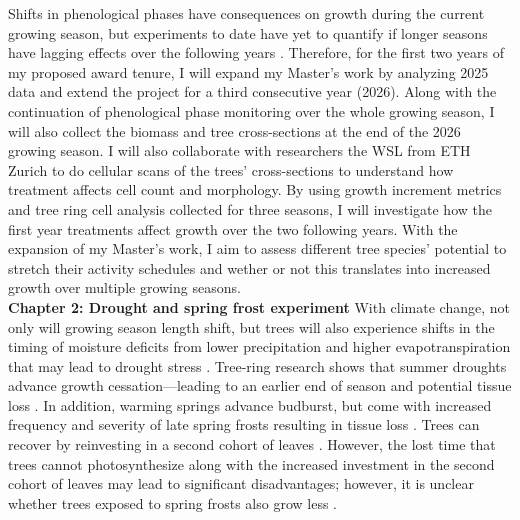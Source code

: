 \documentclass[12pt]{article}
\begin{document}
Shifts in phenological phases have consequences on growth during the current growing season, but experiments to date have yet to quantify if longer seasons have lagging effects over the following years \cite{chapin_ecology_1990,landhausser_partitioning_2012,lawrence_variable_2018,martens_first-year_2007,schott_premature_2013}. Therefore, for the first two years of my proposed award tenure, I will expand my Master's work by analyzing 2025 data and extend the project for a third consecutive year (2026). Along with the continuation of phenological phase monitoring over the whole growing season, I will also collect the biomass and tree cross-sections at the end of the 2026 growing season. I will also collaborate with researchers the WSL from ETH Zurich to do cellular scans of the trees' cross-sections to understand how treatment affects cell count and morphology. By using growth increment metrics and tree ring cell analysis collected for three seasons, I will investigate how the first year treatments affect growth over the two following years. With the expansion of my Master's work, I aim to assess different tree species’ potential to stretch their activity schedules and wether or not this translates into increased growth over multiple growing seasons. \\
\textbf{Chapter 2: Drought and spring frost experiment}
With climate change, not only will growing season length shift, but trees will also experience shifts in the timing of moisture deficits from lower precipitation and higher evapotranspiration that may lead to drought stress \cite{dox_wood_2022}. Tree-ring research shows that summer droughts advance growth cessation---leading to an earlier end of season \cite{kang_earlier_2023} and potential tissue loss \cite{kramer_why_2012}. In addition, warming springs advance budburst, but come with increased frequency and severity of late spring frosts resulting in tissue loss \cite{baumgarten_no_2023,kramer_why_2012}. Trees can recover by reinvesting in a second cohort of leaves \cite{baumgarten_no_2023,dandrea_winters_2019}. However, the lost time that trees cannot photosynthesize along with the increased investment in the second cohort of leaves may lead to significant disadvantages; however, it is unclear whether trees exposed to spring frosts also grow less \cite{chamberlain_late_2021,baumgarten_no_2023}. 
\end{document}
